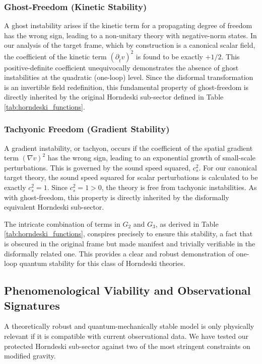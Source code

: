 \documentclass[twocolumn]{aastex631}
\begin{document}
\subsubsection{Ghost-Freedom (Kinetic Stability)}
A ghost instability arises if the kinetic term for a propagating degree of freedom has the wrong sign, leading to a non-unitary theory with negative-norm states. In our analysis of the target frame, which by construction is a canonical scalar field, the coefficient of the kinetic term $(\partial_{\tilde{t}} v)^2$ is found to be exactly $+1/2$. This positive-definite coefficient unequivocally demonstrates the absence of ghost instabilities at the quadratic (one-loop) level. Since the disformal transformation is an invertible field redefinition, this fundamental property of ghost-freedom is directly inherited by the original Horndeski sub-sector defined in Table \ref{tab:horndeski_functions}.

\subsubsection{Tachyonic Freedom (Gradient Stability)}
A gradient instability, or tachyon, occurs if the coefficient of the spatial gradient term $(\nabla v)^2$ has the wrong sign, leading to an exponential growth of small-scale perturbations. This is governed by the sound speed squared, $c_s^2$. For our canonical target theory, the sound speed squared for scalar perturbations is calculated to be exactly $c_s^2 = 1$. Since $c_s^2 = 1 > 0$, the theory is free from tachyonic instabilities. As with ghost-freedom, this property is directly inherited by the disformally equivalent Horndeski sub-sector.

The intricate combination of terms in $G_2$ and $G_3$, as derived in Table \ref{tab:horndeski_functions}, conspires precisely to ensure this stability, a fact that is obscured in the original frame but made manifest and trivially verifiable in the disformally related one. This provides a clear and robust demonstration of one-loop quantum stability for this class of Horndeski theories.

\subsection{Phenomenological Viability and Observational Signatures}

A theoretically robust and quantum-mechanically stable model is only physically relevant if it is compatible with current observational data. We have tested our protected Horndeski sub-sector against two of the most stringent constraints on modified gravity.
\end{document}
